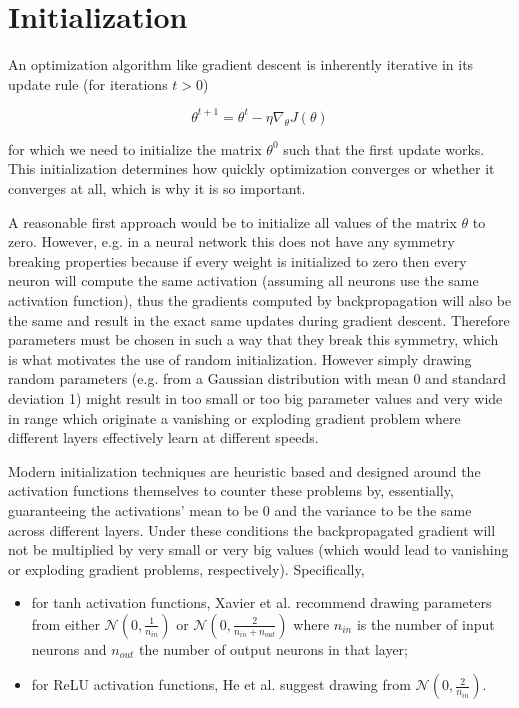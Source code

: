 \section{Initialization}

An optimization algorithm like gradient descent is inherently iterative in its update rule (for iterations $t > 0$)

$$
\theta^{t+1} = \theta^t - \eta \nabla_{\theta} J(\theta)
$$

for which we need to initialize the matrix $\theta^0$ such that the first update works. This initialization determines how quickly optimization converges or whether it converges at all, which is why it is so important.

A reasonable first approach would be to initialize all values of the matrix $\theta$ to zero. However, e.g. in a neural network this does not have any symmetry breaking properties because if every weight is initialized to zero then every neuron will compute the same activation (assuming all neurons use the same activation function), thus the gradients computed by backpropagation will also be the same and result in the exact same updates during gradient descent. Therefore parameters must be chosen in such a way that they break this symmetry, which is what motivates the use of random initialization. However simply drawing random parameters (e.g. from a Gaussian distribution with mean 0 and standard deviation 1) might result in too small or too big parameter values and very wide in range which originate a vanishing or exploding gradient problem where different layers effectively learn at different speeds.

Modern initialization techniques are heuristic based and designed around the activation functions themselves to counter these problems by, essentially, guaranteeing the activations' mean to be $0$ and the variance to be the same across different layers. Under these conditions the backpropagated gradient will not be multiplied by very small or very big values (which would lead to vanishing or exploding gradient problems, respectively). Specifically,

\begin{itemize}
    \item for tanh activation functions, Xavier et al. \cite{xavierinit} recommend drawing parameters from either $\mathcal{N}(0, \frac{1}{n_{in}})$ or $\mathcal{N}(0, \frac{2}{n_{in}+n_{out}})$ where $n_{in}$ is the number of input neurons and $n_{out}$ the number of output neurons in that layer;
    \item for ReLU activation functions, He et al. \cite{heinit} suggest drawing from $\mathcal{N}(0, \frac{2}{n_{in}})$.
\end{itemize}

